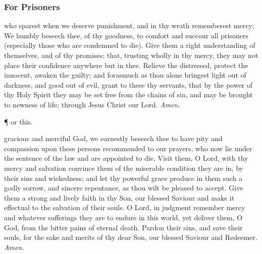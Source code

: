 \subsubsection{For Prisoners}

 who sparest when we deserve punishment, and in thy wrath rememberest mercy; We humbly beseech thee, of thy goodness, to comfort and succour all prisoners (especially those who are condemned to die). Give them a right understanding of themselves, and of thy promises; that, trusting wholly in thy mercy, they may not place their confidence anywhere but in thee. Relieve the distressed, protect the innocent, awaken the guilty; and forasmuch as thou alone bringest light out of darkness, and good out of evil, grant to these thy servants, that by the power of thy Holy Spirit they may be set free from the chains of sin, and may be brought to newness of life; through Jesus Christ our Lord. \textit{Amen.}

\begin{inhead}
	\P{ }or this.
\end{inhead}

\vspace{0.25\baselineskip}

 gracious and merciful God, we earnestly beseech thee to have pity and compassion upon these persons recommended to our prayers, who now lie under the sentence of the law and are appointed to die. Visit them, O Lord, with thy mercy and salvation convince them of the miserable condition they are in, by their sins and wickedness; and let thy powerful grace produce in them such a godly sorrow, and sincere repentance, as thou wilt be pleased to accept. Give them a strong and lively faith in thy Son, our blessed Saviour and make it effectual to the salvation of their souls. O Lord, in judgment remember mercy and whatever sufferings they are to endure in this world, yet deliver them, O God, from the bitter pains of eternal death. Pardon their sins, and save their souls, for the sake and merits of thy dear Son, our blessed Saviour and Redeemer. \textit{Amen.}




